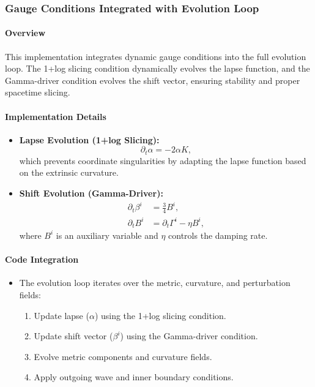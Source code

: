 \documentclass[12pt]{article}
\begin{document}
\subsubsection{Gauge Conditions Integrated with Evolution Loop}

\paragraph{Overview}
This implementation integrates dynamic gauge conditions into the full evolution loop. The 1+log slicing condition dynamically evolves the lapse function, and the Gamma-driver condition evolves the shift vector, ensuring stability and proper spacetime slicing.

\paragraph{Implementation Details}
\begin{itemize}
    \item \textbf{Lapse Evolution (1+log Slicing):}
    \[
    \partial_t \alpha = -2 \alpha K,
    \]
    which prevents coordinate singularities by adapting the lapse function based on the extrinsic curvature.
    \item \textbf{Shift Evolution (Gamma-Driver):}
    \begin{align*}
    \partial_t \beta^i &= \frac{3}{4} B^i, \\
    \partial_t B^i &= \partial_t \Gamma^i - \eta B^i,
    \end{align*}
    where $B^i$ is an auxiliary variable and $\eta$ controls the damping rate.
\end{itemize}

\paragraph{Code Integration}
\begin{itemize}
    \item The evolution loop iterates over the metric, curvature, and perturbation fields:
    \begin{enumerate}
        \item Update lapse ($\alpha$) using the 1+log slicing condition.
        \item Update shift vector ($\beta^i$) using the Gamma-driver condition.
        \item Evolve metric components and curvature fields.
        \item Apply outgoing wave and inner boundary conditions.
    \end{enumerate}
\end{itemize}
\end{document}
